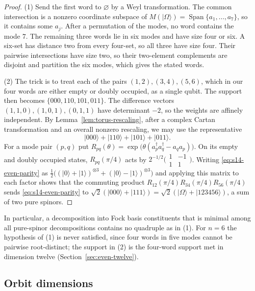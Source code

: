 \documentclass{article}
\theoremstyle{definition}
\theoremstyle{remark}
\newcommand{\vac}{|\Omega\rangle}
\newcommand{\Span}{\operatorname{Span}}
\newcommand{\ket}[1]{\lvert #1\rangle}
\begin{document}
\begin{proof}
(1) Send the first word to $\varnothing$ by a Weyl transformation. The common
intersection is a nonzero coordinate subspace of
$M(\vac)=\Span\{a_1,\ldots,a_7\}$, so it contains some $a_j$. After a
permutation of the modes, no word contains the mode $7$. The remaining three
words lie in six modes and have size four or six. A six-set has distance two
from every four-set, so all three have size four. Their pairwise
intersections have size two, so their two-element complements are disjoint
and partition the six modes, which gives the stated words.

(2) The trick is to treat each of the pairs $(1,2),(3,4),(5,6)$, which in
our four words are either empty or doubly occupied, as a single qubit. The
support then becomes $\{000,110,101,011\}$. The difference vectors $(1,1,0),(1,0,1),(0,1,1)$ have
determinant $-2$, so the weights are affinely independent.
By Lemma~\ref{lem:torus-rescaling}, after a complex Cartan transformation
and an overall nonzero rescaling, we may use the representative
\begin{equation}
 \ket{000}+\ket{110}+\ket{101}+\ket{011}.
 \label{eq:s14-even-parity}
\end{equation}
For a mode pair $(p,q)$ put
$R_{pq}(\theta)=\exp\bigl(\theta(a_p^\dagger a_q^\dagger-a_qa_p)\bigr)$. On
its empty and doubly occupied states, $R_{pq}(\pi/4)$ acts by
$2^{-1/2}\bigl(\begin{smallmatrix}1&-1\\1&1\end{smallmatrix}\bigr)$. Writing
\eqref{eq:s14-even-parity} as
$\frac12\bigl((\ket0+\ket1)^{\otimes3}+(\ket0-\ket1)^{\otimes3}\bigr)$ and
applying this matrix to each factor shows that the commuting product
$R_{12}(\pi/4)R_{34}(\pi/4)R_{56}(\pi/4)$ sends \eqref{eq:s14-even-parity} to
$\sqrt2(\ket{000}+\ket{111})=\sqrt2(\vac+\ket{123456})$, a sum of two pure
spinors.
\end{proof}

In particular, a decomposition into Fock basis constituents that is minimal
among all pure-spinor decompositions contains no quadruple as in (1). For
$n=6$ the hypothesis of (1) is never satisfied, since four words in five
modes cannot be pairwise root-distinct; the support in (2) is the four-word
support met in dimension twelve (Section~\ref{sec:even-twelve}).

\subsection{Orbit dimensions}
\label{sec:orbit-dimensions}
\end{document}
